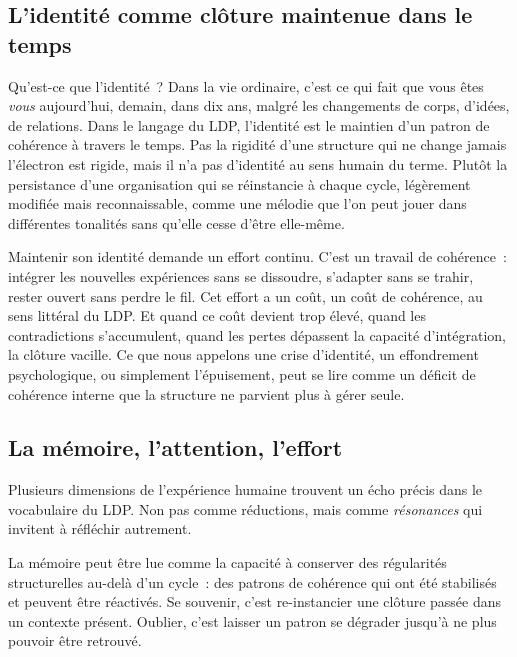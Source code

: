 \documentclass[12pt, a4paper, openright]{book}
\begin{document}
\subsection*{L'identité comme clôture maintenue dans le temps}

Qu'est-ce que l'identité~? Dans la vie ordinaire, c'est ce qui fait que vous êtes \emph{vous} aujourd'hui, demain, dans dix ans, malgré les changements de corps, d'idées, de relations. Dans le langage du LDP, l'identité est le maintien d'un patron de cohérence à travers le temps. Pas la rigidité d'une structure qui ne change jamais l'électron est rigide, mais il n'a pas d'identité au sens humain du terme. Plutôt la persistance d'une organisation qui se réinstancie à chaque cycle, légèrement modifiée mais reconnaissable, comme une mélodie que l'on peut jouer dans différentes tonalités sans qu'elle cesse d'être elle-même.

\medskip

Maintenir son identité demande un effort continu. C'est un travail de cohérence~: intégrer les nouvelles expériences sans se dissoudre, s'adapter sans se trahir, rester ouvert sans perdre le fil. Cet effort a un coût, un coût de cohérence, au sens littéral du LDP. Et quand ce coût devient trop élevé, quand les contradictions s'accumulent, quand les pertes dépassent la capacité d'intégration, la clôture vacille. Ce que nous appelons une crise d'identité, un effondrement psychologique, ou simplement l'épuisement, peut se lire comme un déficit de cohérence interne que la structure ne parvient plus à gérer seule.

\subsection*{La mémoire, l'attention, l'effort}

Plusieurs dimensions de l'expérience humaine trouvent un écho précis dans le vocabulaire du LDP. Non pas comme réductions, mais comme \emph{résonances} qui invitent à réfléchir autrement.

\medskip

La mémoire peut être lue comme la capacité à conserver des régularités structurelles au-delà d'un cycle~: des patrons de cohérence qui ont été stabilisés et peuvent être réactivés. Se souvenir, c'est re-instancier une clôture passée dans un contexte présent. Oublier, c'est laisser un patron se dégrader jusqu'à ne plus pouvoir être retrouvé.

\medskip
\end{document}
